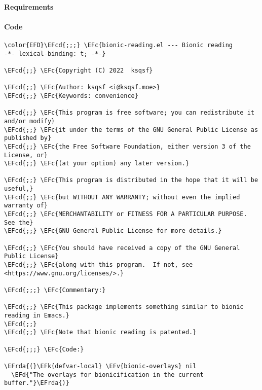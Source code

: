 \documentclass[a4wide,10pt]{article}
\newcommand{\EFc}[1]{\textcolor{EFc}{#1}} %
\newcommand{\EFcd}[1]{\textcolor{EFcd}{#1}} %
\newcommand{\EFd}[1]{\textcolor{EFd}{#1}} %
\newcommand{\EFk}[1]{\textcolor{EFk}{#1}} %
\newcommand{\EFv}[1]{\textcolor{EFv}{#1}} %
\newcommand{\EFrda}[1]{\textcolor{EFrda}{#1}} %
\begin{document}
\paragraph{Requirements}
\label{sec:org4e8c363}
\paragraph{Code}
\label{sec:orga2035f6}
\begin{Code}
\begin{Verbatim}
\color{EFD}\EFcd{;;;} \EFc{bionic-reading.el --- Bionic reading             -*- lexical-binding: t; -*-}

\EFcd{;;} \EFc{Copyright (C) 2022  ksqsf}

\EFcd{;;} \EFc{Author: ksqsf <i@ksqsf.moe>}
\EFcd{;;} \EFc{Keywords: convenience}

\EFcd{;;} \EFc{This program is free software; you can redistribute it and/or modify}
\EFcd{;;} \EFc{it under the terms of the GNU General Public License as published by}
\EFcd{;;} \EFc{the Free Software Foundation, either version 3 of the License, or}
\EFcd{;;} \EFc{(at your option) any later version.}

\EFcd{;;} \EFc{This program is distributed in the hope that it will be useful,}
\EFcd{;;} \EFc{but WITHOUT ANY WARRANTY; without even the implied warranty of}
\EFcd{;;} \EFc{MERCHANTABILITY or FITNESS FOR A PARTICULAR PURPOSE.  See the}
\EFcd{;;} \EFc{GNU General Public License for more details.}

\EFcd{;;} \EFc{You should have received a copy of the GNU General Public License}
\EFcd{;;} \EFc{along with this program.  If not, see <https://www.gnu.org/licenses/>.}

\EFcd{;;;} \EFc{Commentary:}

\EFcd{;;} \EFc{This package implements something similar to bionic reading in Emacs.}
\EFcd{;;}
\EFcd{;;} \EFc{Note that bionic reading is patented.}

\EFcd{;;;} \EFc{Code:}

\EFrda{(}\EFk{defvar-local} \EFv{bionic-overlays} nil
  \EFd{"The overlays for bionicification in the current buffer."}\EFrda{)}


\end{Verbatim}
\end{Code}
\end{document}
